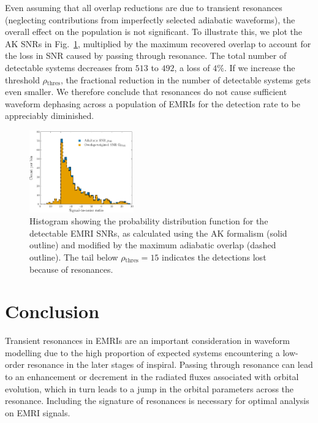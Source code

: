 \documentclass[aps,prd,amsfonts,amssymb,amsmath,nofootinbib,showpacs,superscriptaddress,twocolumn,floatfix]{revtex4-1}
\newcommand{\figref}[1]{Fig.~\ref{fig:#1}}
\newcommand{\sub}[1]{\ensuremath{_\mathrm{#1}}}
\begin{document}
Even assuming that all overlap reductions are due to transient resonances (neglecting contributions from imperfectly selected adiabatic waveforms), the overall effect on the population is not significant. To illustrate this, we plot the AK SNRs in \figref{pop-SNR-dist}, multiplied by the maximum recovered overlap to account for the loss in SNR caused by passing through resonance. The total number of detectable systems decreases from $513$ to $492$, a loss of $4\%$. If we increase the threshold $\rho\sub{thres}$, the fractional reduction in the number of detectable systems gets even smaller. We therefore conclude that resonances do not cause sufficient waveform dephasing across a population of EMRIs for the detection rate to be appreciably diminished.

\begin{figure}
\centering
\includegraphics[width=0.4\textwidth]{Fig_res_pop_SNR_overlap}
\caption{\label{fig:pop-SNR-dist}Histogram showing the probability distribution function for the detectable EMRI SNRs, as calculated using the AK formalism (solid outline) and modified by the maximum adiabatic overlap (dashed outline). The tail below $\rho\sub{thres} = 15$ indicates the detections lost because of resonances.}
\end{figure}

\section{Conclusion}
\label{sec:conclusion}

Transient resonances in EMRIs are an important consideration in waveform modelling due to the high proportion of expected systems encountering a low-order resonance in the later stages of inspiral. Passing through resonance can lead to an enhancement or decrement in the radiated fluxes associated with orbital evolution, which in turn leads to a jump in the orbital parameters across the resonance. Including the signature of resonances is necessary for optimal analysis on EMRI signals. 
\end{document}
